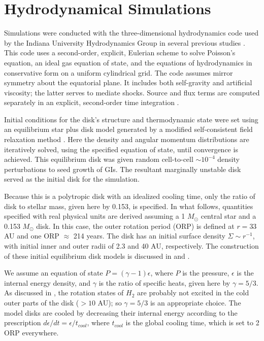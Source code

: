 \documentclass[manuscript]{aastex}
\begin{document}
\section{Hydrodynamical Simulations}

Simulations were conducted with the three-dimensional hydrodynamics code used by the Indiana University Hydrodynamics Group in several previous studies \citep{pickett1998, pickett2000, mejiaphd2004, mejia2005, boley2006, cai2008}.  This code uses a second-order, explicit, Eulerian scheme to solve Poisson's equation, an ideal gas equation of state, and the equations of hydrodynamics in conservative form on a uniform cylindrical grid.  The code assumes mirror symmetry about the equatorial plane. It includes both self-gravity and artificial viscosity; the latter serves to 
mediate shocks. Source and flux terms \citep{norman1986} are computed separately in an explicit, second-order time integration \citep{albada1982,christodoulou1991,yangphd1992}.

Initial conditions for the disk's structure and thermodynamic state were set using an equilibrium star plus disk model generated by a modified \citet{hachisu1986} self-consistent field relaxation method \citep{pickett1996,pickett2003,mejiaphd2004,mejia2005,cai2006}. Here  the density and angular momentum distributions are iteratively solved, using the specified equation of state,  until convergence is achieved. This  equilibrium disk was 
given random cell-to-cell $\sim10^{-4}$ density perturbations to seed growth of  GIs.  The resultant marginally unstable disk served as the initial disk for the simulation.

Because this is a polytropic disk with an idealized cooling time, only the ratio of disk to stellar mass, given here by
0.153, is specified.  In what follows, quantities specified with real physical units are derived assuming a 1 $M_\odot$
central star and a 0.153  $M_\odot$ disk. In this case, the outer rotation period (ORP) is defined at $r = 33$ AU and
one ORP $\approx$ 214 years.  The disk has an initial surface density $\Sigma \sim r^{ -1}$, with initial inner and
outer radii of 2.3 and 40 AU, respectively. The construction of these initial equilibrium disk models is discussed in
\citet{pickett2003} and \citet{mejia2005}.

 We assume an equation of state $P = (\gamma -1)\epsilon$, where $P$ is the pressure, $\epsilon$ is the internal energy
 density, and $\gamma$ is the ratio of specific heats, given here by $\gamma = 5/3$. As discussed in \citet{boley2007a},
 the rotation states of $H_2$ are probably not excited in the cold outer parts of the disk ($> 10$ AU); so $\gamma =
 5/3$ is an appropriate choice. The model disks are cooled by decreasing their internal energy according to the prescription $d\epsilon/dt = \epsilon / t_{cool}$, where $t_{cool}$ is the global cooling time, which is set to 2 ORP everywhere. 
 
\end{document}
